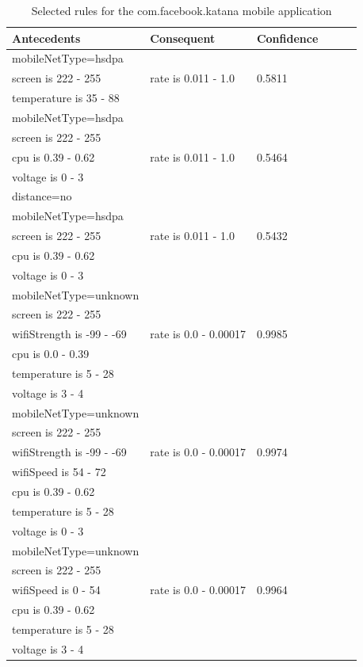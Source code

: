 \begin{table} \small%
\begin{tabular}{|p{5.0cm}|p{3.0cm}|p{2.0cm}|p{1.5cm}|p{0.3cm}| p{0.3cm}|}
\hline
Antecedents & Consequent & Confidence \\
\hline
	mobileNetType=hsdpa 		& & \\
	screen is 222 - 255			& rate is 0.011 - 1.0 & 0.5811 \\
	temperature is 35 - 88		& & \\
\hline
	mobileNetType=hsdpa			& & \\
	screen is 222 - 255			& & \\
	cpu is 0.39 - 0.62			& rate is 0.011 - 1.0 & 0.5464 \\
	voltage is 0 - 3			& & \\
	distance=no					& & \\
\hline
	mobileNetType=hsdpa			& & \\
	screen is 222 - 255			& rate is 0.011 - 1.0 & 0.5432 \\
	cpu is 0.39 - 0.62			& & \\
	voltage is 0 - 3			& & \\
\hline
	mobileNetType=unknown		& & \\
	screen is 222 - 255			& & \\
	wifiStrength is -99 - -69	& rate is 0.0 - 0.00017 & 0.9985 \\
	cpu is 0.0 - 0.39			& & \\
	temperature is 5 - 28		& & \\
	voltage is 3 - 4			& & \\
\hline
	mobileNetType=unknown		& & \\
	screen is 222 - 255			& & \\
	wifiStrength is -99 - -69	& rate is 0.0 - 0.00017 & 0.9974 \\
	wifiSpeed is 54 - 72		& & \\
	cpu is 0.39 - 0.62			& & \\
	temperature is 5 - 28		& & \\
	voltage is 0 - 3			& & \\
\hline
	mobileNetType=unknown		& & \\
	screen is 222 - 255			& & \\
	wifiSpeed is 0 - 54			& rate is 0.0 - 0.00017 & 0.9964 \\
	cpu is 0.39 - 0.62			& & \\
	temperature is 5 - 28		& & \\
	voltage is 3 - 4			& & \\
\hline
\end{tabular}
	\caption{Selected rules for the com.facebook.katana mobile application}
	\label{table:rules-facebook}
\end{table}

